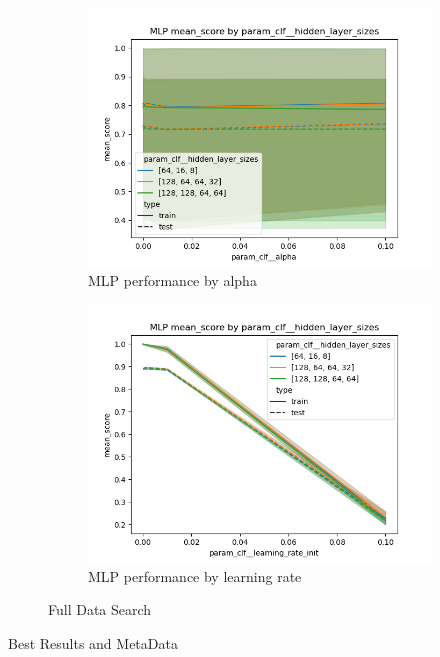 \documentclass[12pt]{article}
\begin{document}
\begin{figure}
\begin{subfigure}{.5\textwidth}
        \includegraphics[width=.95\textwidth]{../results/mlp/param_clf__hidden_layer_sizes_mean_score_param_clf__alpha.png}
        \caption{MLP performance by alpha} 
        \end{subfigure}%
      \begin{subfigure}{.5\textwidth}
        \includegraphics[width=.95\textwidth]{../results/mlp/param_clf__hidden_layer_sizes_mean_score_param_clf__learning_rate_init.png}
        \caption{MLP performance by learning rate}
      \end{subfigure}
    \caption{Full Data Search}
    \label{figure2}
\end{figure}

\begin{table}
    \resizebox*{.95\textwidth}{!}{}
    \caption{Best Results and MetaData}
    \label{table1}
\end{table}
  
\end{document}
